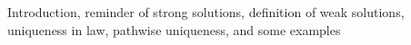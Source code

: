Introduction, reminder of strong solutions, definition of weak solutions, uniqueness in law, pathwise uniqueness, and some examples